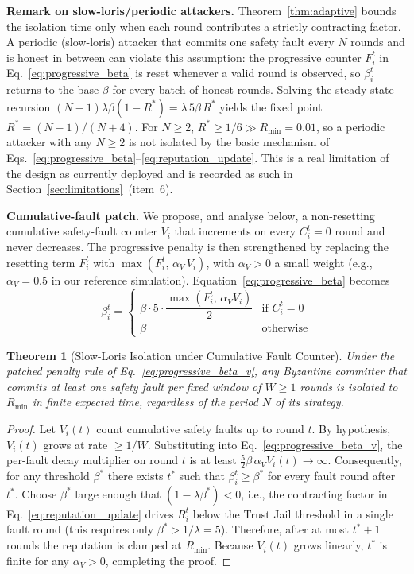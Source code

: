 \documentclass[journal]{IEEEtran}
\newtheorem{theorem}{Theorem}
\begin{document}
\textbf{Remark on slow-loris/periodic attackers.} Theorem~\ref{thm:adaptive} bounds the isolation time only when each round contributes a strictly contracting factor. A {periodic} (slow-loris) attacker that commits one safety fault every $N$ rounds and is honest in between can violate this assumption: the progressive counter $F_i^t$ in Eq.~\ref{eq:progressive_beta} is reset whenever a valid round is observed, so $\beta_i^t$ returns to the base $\beta$ for every batch of honest rounds. Solving the steady-state recursion $(N-1)\lambda\beta(1-R^{*}) = \lambda\,5\beta\,R^{*}$ yields the fixed point $R^{*} = (N-1)/(N+4)$. For $N\ge 2$, $R^{*} \ge 1/6 \gg R_{\min}=0.01$, so a periodic attacker with any $N\ge 2$ is {not} isolated by the basic mechanism of Eqs.~\ref{eq:progressive_beta}--\ref{eq:reputation_update}. This is a real limitation of the design as currently deployed and is recorded as such in Section~\ref{sec:limitations}~(item~6).

\textbf{Cumulative-fault patch.} We propose, and analyse below, a non-resetting cumulative safety-fault counter $V_i$ that increments on every $C_i^{t}=0$ round and never decreases. The progressive penalty is then strengthened by replacing the resetting term $F_i^t$ with $\max(F_i^t,\, \alpha_V\,V_i)$, with $\alpha_V > 0$ a small weight (e.g., $\alpha_V = 0.5$ in our reference simulation). Equation~\ref{eq:progressive_beta} becomes
\begin{equation}
\beta_i^{t} = \begin{cases}
\beta\cdot 5 \cdot \dfrac{\max(F_i^{t},\,\alpha_V V_i)}{2} & \text{if } C_i^{t}=0\\
\beta & \text{otherwise}
\end{cases}
\label{eq:progressive_beta_v}
\end{equation}

\begin{theorem}[Slow-Loris Isolation under Cumulative Fault Counter]
\label{thm:slowloris}
Under the patched penalty rule of Eq.~\ref{eq:progressive_beta_v}, any Byzantine committer that commits at least one safety fault per fixed window of $W \ge 1$ rounds is isolated to $R_{\min}$ in finite expected time, regardless of the period $N$ of its strategy.
\end{theorem}
\begin{proof}
Let $V_i(t)$ count cumulative safety faults up to round $t$. By hypothesis, $V_i(t)$ grows at rate $\ge 1/W$. Substituting into Eq.~\ref{eq:progressive_beta_v}, the per-fault decay multiplier on round $t$ is at least $\tfrac{5}{2}\beta\,\alpha_V V_i(t) \to \infty$. Consequently, for any threshold $\beta^{*}$ there exists $t^{*}$ such that $\beta_i^{t}\ge \beta^{*}$ for every fault round after $t^{*}$. Choose $\beta^{*}$ large enough that $(1-\lambda\beta^{*})<0$, i.e., the contracting factor in Eq.~\ref{eq:reputation_update} drives $R_i^{t}$ below the Trust Jail threshold in a single fault round (this requires only $\beta^{*}>1/\lambda=5$). Therefore, after at most $t^{*}+1$ rounds the reputation is clamped at $R_{\min}$. Because $V_i(t)$ grows linearly, $t^{*}$ is finite for any $\alpha_V>0$, completing the proof.
\end{proof}
\end{document}
